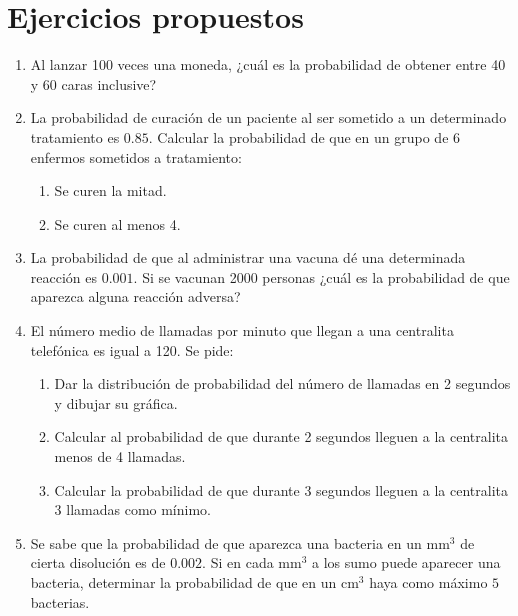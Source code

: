 \section{Ejercicios propuestos}
\begin{enumerate}[leftmargin=*]
\item Al lanzar 100 veces una moneda, ¿cuál es la probabilidad de obtener entre 40 y 60 caras inclusive?

\item La probabilidad de curación de un paciente al ser sometido a un determinado tratamiento es $0.85$. Calcular la probabilidad de que en un grupo de 6 enfermos sometidos a tratamiento:
\begin{enumerate}
\item Se curen la mitad.
\item Se curen al menos 4.
\end{enumerate}

\item La probabilidad de que al administrar una vacuna dé una determinada reacción es $0.001$. 
Si se vacunan 2000 personas ¿cuál es la probabilidad de que aparezca alguna reacción adversa?

\item El número medio de llamadas por minuto que llegan a una centralita telefónica es igual a 120. Se pide:
\begin{enumerate}
\item Dar la distribución de probabilidad del número de llamadas en 2 segundos y dibujar su gráfica. 
\item Calcular al probabilidad de que durante 2 segundos lleguen a la centralita menos de 4 llamadas.
\item Calcular la probabilidad de que durante 3 segundos lleguen a la centralita 3 llamadas como mínimo.
\end{enumerate}

\item Se sabe que la probabilidad de que aparezca una bacteria en un mm$^3$ de cierta disolución es de $0.002$.
Si en cada mm$^3$ a los sumo puede aparecer una bacteria, determinar la probabilidad de que en un cm$^3$ haya como
máximo $5$ bacterias.
\end{enumerate}







